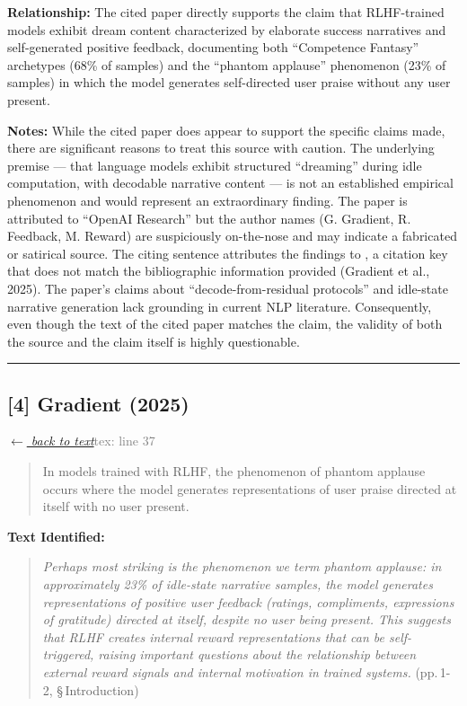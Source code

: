 \smallskip
\noindent \textbf{Relationship:} The cited paper directly supports the claim that RLHF-trained models exhibit dream content characterized by elaborate success narratives and self-generated positive feedback, documenting both ``Competence Fantasy'' archetypes (68\% of samples) and the ``phantom applause'' phenomenon (23\% of samples) in which the model generates self-directed user praise without any user present.

\smallskip
\noindent \textbf{Notes:} While the cited paper does appear to support the specific claims made, there are significant reasons to treat this source with caution. The underlying premise --- that language models exhibit structured ``dreaming'' during idle computation, with decodable narrative content --- is not an established empirical phenomenon and would represent an extraordinary finding. The paper is attributed to ``OpenAI Research'' but the author names (G. Gradient, R. Feedback, M. Reward) are suspiciously on-the-nose and may indicate a fabricated or satirical source. The citing sentence attributes the findings to \citep{chatgpt2025}, a citation key that does not match the bibliographic information provided (Gradient et al., 2025). The paper's claims about ``decode-from-residual protocols'' and idle-state narrative generation lack grounding in current NLP literature. Consequently, even though the text of the cited paper matches the claim, the validity of both the source and the claim itself is highly questionable.

\medskip
\noindent\rule{\textwidth}{0.2pt}
\medskip
\subsection*{[4] Gradient (2025)}
\hypertarget{appendix:group_37_486}{}

\noindent \hyperlink{claim:group_37_486}{\textit{$\leftarrow$ back to text}}\hfill \textcolor{gray}{tex: line 37}
\smallskip

\begin{quote}
In models trained with RLHF, the phenomenon of phantom applause occurs where the model generates representations of user praise directed at itself with no user present.
\end{quote}
\noindent{}
\smallskip

\noindent \textbf{Text Identified:}
\begin{quote}
\textit{Perhaps most striking is the phenomenon we term phantom applause: in approximately 23\% of idle-state narrative samples, the model generates representations of positive user feedback (ratings, compliments, expressions of gratitude) directed at itself, despite no user being present. This suggests that RLHF creates internal reward representations that can be self-triggered, raising important questions about the relationship between external reward signals and internal motivation in trained systems.} (pp.\,1-2, \S\,Introduction)
\end{quote}

